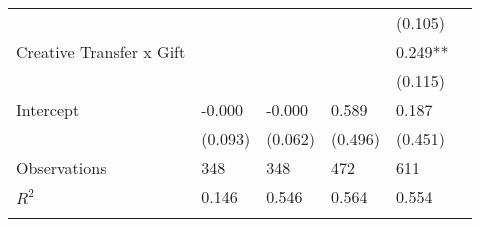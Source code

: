 \documentclass{article}
\begin{document}
\begin{table}[H]
\begin{center}
{\begin{tabular}{llllll}
                    &               &               &               &     (0.105)   \\
Creative Transfer x Gift&               &               &               &       0.249** \\
                    &               &               &               &     (0.115)   \\
Intercept           &      -0.000   &      -0.000   &       0.589   &       0.187   \\
                    &     (0.093)   &     (0.062)   &     (0.496)   &     (0.451)   \\[2mm]
\hline
Observations        &         348   &         348   &         472   &         611   \\
$R^2$               &       0.146   &       0.546   &       0.564   &       0.554   \\
\hline\noalign{\medskip}
\end{tabular}}
\end{center}
\end{table}
\end{document}
